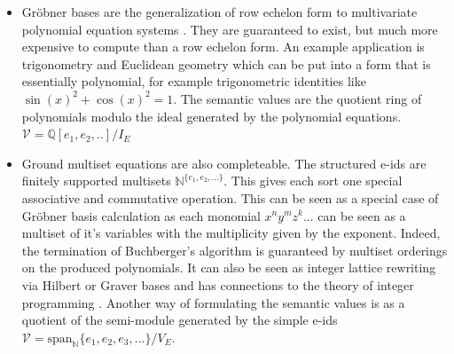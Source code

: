 \documentclass[sigconf]{acmart}
\begin{document}
\begin{itemize}


From the e-graph as model perspective, the semantic domain of these semantic e-ids is a vector space of uninterpreted e-ids quotiented by the subspace spanned by the asserted linear equations. $\mathcal{V} = \mathrm{span}_\mathbb{Q} \{ e_1, e_2, e_3, ... \} \Big/ V_E$. Affine equations work similarly.


\item Gr\"{o}bner bases are the generalization of row echelon form to multivariate polynomial equation systems \cite{Cox2015}\cite{grobnerpap}. They are guaranteed to exist, but much more expensive to compute than a row echelon form. An example application is trigonometry and Euclidean geometry which can be put into a form that is essentially polynomial, for example trigonometric identities like $\sin(x)^2 + \cos(x)^2 = 1$.   The semantic values are the quotient ring of polynomials modulo the ideal generated by the polynomial equations. $\mathcal{V} = \mathbb{Q}[e_1,e_2,..] \Big/ I_E$
\item Ground multiset equations are also completeable. The structured e-ids are finitely supported multisets $\mathbb{N}^{\{e_1, e_2, ...\}}$. This gives each sort one special associative and commutative operation. \cite{acegraph} This can be seen as a special case of Gr\"{o}bner basis calculation as each monomial $x^n y^m z^k...$ can be seen as a multiset of it's variables with the multiplicity given by the exponent. Indeed, the termination of Buchberger's algorithm is guaranteed by multiset orderings on the produced polynomials. It can also be seen as integer lattice rewriting via Hilbert or Graver bases and has connections to the theory of integer programming \cite{sturmfels1996grobner}. Another way of formulating the semantic values is as a quotient of the semi-module generated by the simple e-ids $\mathcal{V} = \mathrm{span}_\mathbb{N} \{ e_1, e_2, e_3, ... \} \Big/ V_E$. %


\end{itemize}
\end{document}
